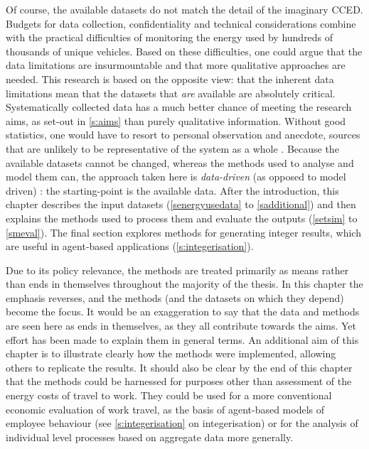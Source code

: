 Of course, the available datasets do not match the detail of the imaginary CCED.
Budgets for data collection, confidentiality and technical
considerations combine with the practical
difficulties of monitoring the energy used by hundreds of thousands of unique
vehicles. Based on these difficulties, one could argue that the data
limitations are insurmountable and that more qualitative approaches are needed.
This research is based on the opposite view: that the inherent data limitations
mean that the datasets that \emph{are} available are
absolutely critical. Systematically collected data has a much better chance of
meeting the research aims, as set-out in \cref{s:aims} than purely qualitative
information. Without good statistics, one would have to resort to personal
observation and anecdote, sources that are unlikely to be
representative of the system as a whole \citep{Rubin1987}. Because the available
datasets cannot be
changed, whereas the methods used to analyse and model them can, the approach
taken here is \emph{data-driven} (as opposed to model driven)
\citep{anselin1989special}: the starting-point is the available data.
After the introduction, this chapter describes the input
datasets (\cref{senergyusedata} to \cref{sadditional}) and then
explains the methods used to process them and evaluate the outputs (\cref{setsim} to
\cref{smeval}). The final section explores methods for generating
integer results, which are useful in agent-based applications (\cref{s:integerisation}).

Due to its policy relevance, the methods 
are treated primarily as means rather than ends in themselves throughout
the majority of the thesis. In this chapter the emphasis reverses, and the methods
(and the datasets on which they depend) become the focus. It would be an
exaggeration to say that the data and
methods are seen here as ends in themselves, as they all contribute towards the
aims. Yet effort has been made to explain them in general terms. An
additional aim of this chapter is to illustrate clearly how the methods
were implemented, allowing others to replicate the results. It should also be
clear by the end of this chapter that the methods could be harnessed for
purposes other than assessment
of the energy costs of travel to work. They could be used
for a more conventional economic evaluation of work travel, as the basis of
agent-based models of employee behaviour (see
\cref{s:integerisation} on integerisation) or for the analysis
of individual level processes based on aggregate data more generally.

